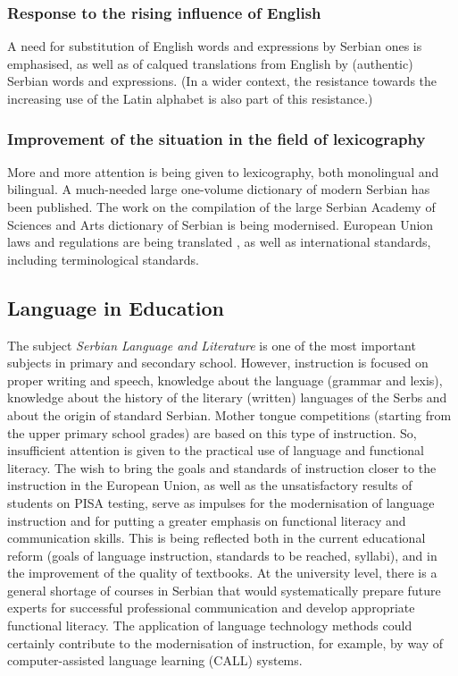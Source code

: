 {\begin{multicols}{2}
 \subsubsection {Response to the rising influence of English}
 
 A need for substitution of English words and expressions by Serbian ones is emphasised, as well as of calqued translations from English by (authentic) Serbian words and expressions. (In a wider context, the resistance towards the increasing use of the Latin alphabet is also part of this resistance.)
 

 \subsubsection {Improvement of the situation in the field of lexicography}
   
 
 More and more attention is being given to lexicography, both monolingual and bilingual. A much-needed large one-volume dictionary of modern Serbian has been published. The work on the compilation of the large Serbian Academy of Sciences and Arts dictionary of Serbian is being modernised.
European Union laws and regulations are being translated \cite{SEIO}, as well as international standards, \cite{ISS} including terminological standards.
 
 \subsection {Language in Education}
   
The subject \textit{Serbian Language and Literature} is one of the most important subjects in primary and secondary school. However, instruction is focused on proper writing and speech, knowledge about the language (grammar and lexis), knowledge about the history of the literary (written) languages of the Serbs and about the origin of standard Serbian. Mother tongue competitions (starting from the upper primary school grades) are based on this type of instruction. So, insufficient attention is given to the practical use of language and functional literacy.  
The wish to bring the goals and standards of instruction closer to the instruction in the European Union, as well as the unsatisfactory results of students on PISA testing, serve as impulses for the modernisation of language instruction and for putting a greater emphasis on functional literacy and communication skills. This is being reflected both in the current educational reform (goals of language instruction, standards to be reached, syllabi), and in the improvement of the quality of textbooks. At the university level, there is a general shortage of courses in Serbian that would systematically prepare future experts for successful professional communication and develop appropriate functional literacy.
The application of language technology methods could certainly contribute to the modernisation of instruction, for example, by way of computer-assisted language learning (CALL) systems.  


\end{multicols}}
